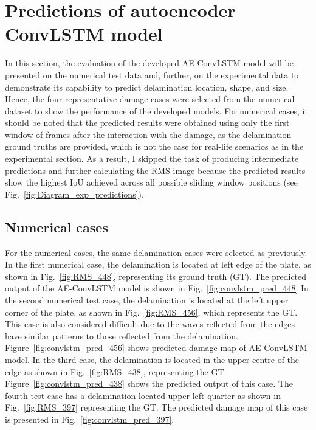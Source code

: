 \section{Predictions of autoencoder ConvLSTM model}
\label{sec53}
In this section, the evaluation of the developed AE-ConvLSTM model will be presented on the numerical test data and, further, on the experimental data to demonstrate its capability to predict delamination location, shape, and size.
Hence, the four representative damage cases were selected from the numerical dataset to show the performance of the developed models.
For numerical cases, it should be noted that the predicted results were obtained using only the first window of frames after the interaction with the damage, as the delamination ground truths are provided, which is not the case for real-life scenarios as in the experimental section. 
As a result, I skipped the task of producing intermediate predictions and further calculating the RMS image because the predicted results show the highest IoU achieved across all possible sliding window positions (see Fig.~\ref{fig:Diagram_exp_predictions}).

\subsection{Numerical cases}
\label{sec531}
For the numerical cases, the same delamination cases were selected as previously.
In the first numerical case, the delamination is located at left edge of the plate, as shown in Fig.~\ref{fig:RMS_448}, representing its ground truth (GT).
The predicted output of the AE-ConvLSTM model is shown in Fig.~\ref{fig:convlstm_pred_448}
In the second numerical test case, the delamination is located at the left upper corner of the plate, as shown in Fig.~\ref{fig:RMS_456}, which represents the GT.
This case is also considered difficult due to the waves reflected from the edges have similar patterns to those reflected from the delamination.
Figure~\ref{fig:convlstm_pred_456} shows predicted damage map of AE-ConvLSTM model.
In the third case, the delamination is located in the upper centre of the edge as shown in Fig.~\ref{fig:RMS_438}, representing the GT. 
Figure~\ref{fig:convlstm_pred_438} shows the predicted output of this case.
The fourth test case has a delamination located upper left quarter as shown in Fig.~\ref{fig:RMS_397} representing the GT.
The predicted damage map of this case is presented in Fig.~\ref{fig:convlstm_pred_397}.

